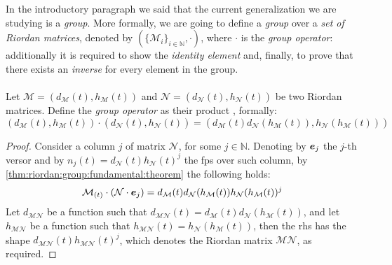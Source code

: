 In the introductory paragraph we said that the current generalization
we are studying is a \emph{group}. More formally, we are going to define a 
\emph{group} over a \emph{set of Riordan matrices}, 
denoted by $(\lbrace \mathcal{M}_{i}\rbrace_{i\in\mathbb{N}},\cdot)$, 
where $\cdot$ is the \emph{group
operator}: additionally it is required to show the \emph{identity element} and,
finally, to prove that there exists an \emph{inverse} for every element in the group.
\\\\
Let $\mathcal{M}=\left(d_{\mathcal{M}}(t),h_{\mathcal{M}}(t)\right)$ and
$\mathcal{N}=\left(d_{\mathcal{N}}(t),h_{\mathcal{N}}(t)\right)$ be two Riordan matrices.
Define the \emph{group operator} as their product
, formally:
\begin{displaymath}
    \left(d_{\mathcal{M}}(t),h_{\mathcal{M}}(t)\right)\cdot
        \left(d_{\mathcal{N}}(t),h_{\mathcal{N}}(t)\right) = 
        \left(d_{\mathcal{M}}(t)d_{\mathcal{N}}(h_{\mathcal{M}}(t)),
            h_{\mathcal{N}}(h_{\mathcal{M}}(t))\right)
\end{displaymath}
\begin{proof}
    Consider a column $j$ of matrix $\mathcal{N}$,
    for some $j\in\mathbb{N}$. Denoting by $\boldsymbol{e}_{j}$ the $j$-th versor and
    by $n_{j}(t)=d_{\mathcal{N}}(t)h_{\mathcal{N}}(t)^{j}$ the \ac{fps} over such column, 
    by \autoref{thm:riordan:group:fundamental:theorem} the following holds:
    \begin{displaymath}
        \mathcal{M}_{(t)}\cdot\left(\mathcal{N}\cdot\boldsymbol{e}_{j}\right)
            = d_{\mathcal{M}}(t) d_{\mathcal{N}}(h_{\mathcal{M}}(t))
                h_{\mathcal{N}}(h_{\mathcal{M}}(t))^{j}
    \end{displaymath}
    Let $d_{\mathcal{M}\mathcal{N}}$ be a function such that 
    $d_{\mathcal{M}\mathcal{N}}(t)=d_{\mathcal{M}}(t) d_{\mathcal{N}}( h_{\mathcal{M}}(t))$,
    and let $h_{\mathcal{M}\mathcal{N}}$ be a function such that 
    $h_{\mathcal{M}\mathcal{N}}(t)=h_{\mathcal{N}}(h_{\mathcal{M}}(t))$, then the \ac{rhs}
    has the shape
    $d_{\mathcal{M}\mathcal{N}}(t)h_{\mathcal{M}\mathcal{N}}(t)^{j}$, which denotes the
    Riordan matrix $\mathcal{M}\mathcal{N}$, as required.

\end{proof}

